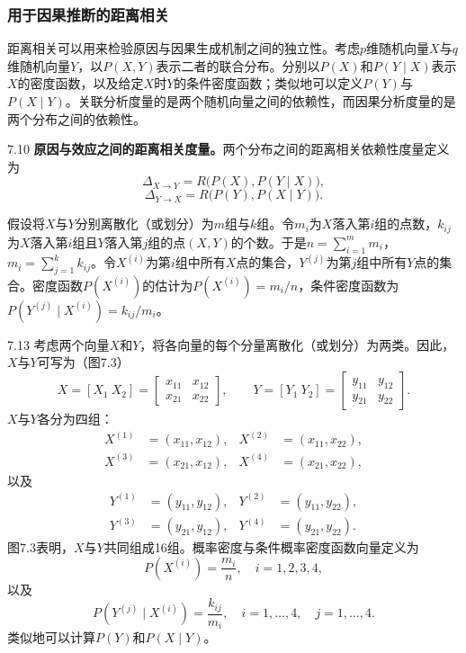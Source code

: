\subsubsection{用于因果推断的距离相关}
距离相关可以用来检验原因与因果生成机制之间的独立性。考虑$p$维随机向量$X$与$q$维随机向量$Y$，以$P(X,Y)$表示二者的联合分布。分别以$P(X)$和$P(Y\mid X)$表示$X$的密度函数，以及给定$X$时$Y$的条件密度函数；类似地可以定义$P(Y)$与$P(X\mid Y)$。关联分析度量的是两个随机向量之间的依赖性，而因果分析度量的是两个分布之间的依赖性。

\begin{bookdefinition}{7.10}
\textbf{原因与效应之间的距离相关度量。}两个分布之间的距离相关依赖性度量定义为
\begin{equation}
\Delta_{X\to Y}=R\bigl(P(X),P(Y\mid X)\bigr),\tag{7.181}
\end{equation}
\begin{equation}
\Delta_{Y\to X}=R\bigl(P(Y),P(X\mid Y)\bigr).\tag{7.182}
\end{equation}
\end{bookdefinition}
假设将$X$与$Y$分别离散化（或划分）为$m$组与$k$组。令$m_i$为$X$落入第$i$组的点数，$k_{ij}$为$X$落入第$i$组且$Y$落入第$j$组的点$(X,Y)$的个数。于是$n=\sum_{i=1}^m m_i$，$m_i=\sum_{j=1}^k k_{ij}$。令$X^{(i)}$为第$i$组中所有$X$点的集合，$Y^{(j)}$为第$j$组中所有$Y$点的集合。密度函数$P(X^{(i)})$的估计为$P(X^{(i)})=m_i/n$，条件密度函数为$P(Y^{(j)}\mid X^{(i)})=k_{ij}/m_i$。

\begin{bookexample}{7.13}
考虑两个向量$X$和$Y$，将各向量的每个分量离散化（或划分）为两类。因此，$X$与$Y$可写为（图7.3）
\[
X=[X_1\ X_2]=\begin{bmatrix}x_{11}&x_{12}\\x_{21}&x_{22}\end{bmatrix},\qquad
Y=[Y_1\ Y_2]=\begin{bmatrix}y_{11}&y_{12}\\y_{21}&y_{22}\end{bmatrix}.
\]
$X$与$Y$各分为四组：
\[
\begin{aligned}
X^{(1)}&=(x_{11},x_{12}),&X^{(2)}&=(x_{11},x_{22}),\\
X^{(3)}&=(x_{21},x_{12}),&X^{(4)}&=(x_{21},x_{22}),
\end{aligned}
\]
以及
\[
\begin{aligned}
Y^{(1)}&=(y_{11},y_{12}),&Y^{(2)}&=(y_{11},y_{22}),\\
Y^{(3)}&=(y_{21},y_{12}),&Y^{(4)}&=(y_{21},y_{22}).
\end{aligned}
\]
图7.3表明，$X$与$Y$共同组成16组。概率密度与条件概率密度函数向量定义为
\[
P(X^{(i)})=\frac{m_i}{n},\quad i=1,2,3,4,
\]
以及
\[
P(Y^{(j)}\mid X^{(i)})=\frac{k_{ij}}{m_i},\quad i=1,\ldots,4,\quad j=1,\ldots,4.
\]
类似地可以计算$P(Y)$和$P(X\mid Y)$。
\end{bookexample}
\begin{figure}[htbp]
\centering

\end{figure}

